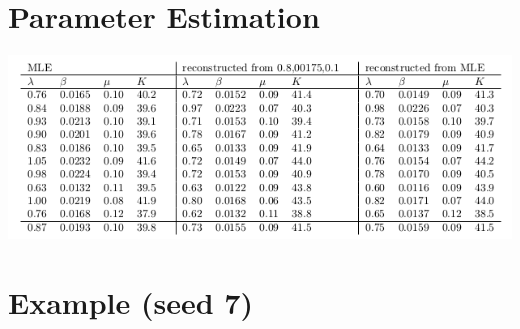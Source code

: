 \documentclass[10pt,a4paper]{article}
\begin{document}
\section{Parameter Estimation}
\begin{center}
\includegraphics[scale=0.8]{table1.png}
\end{center}
\section{Example (seed 7)}
\end{document}
